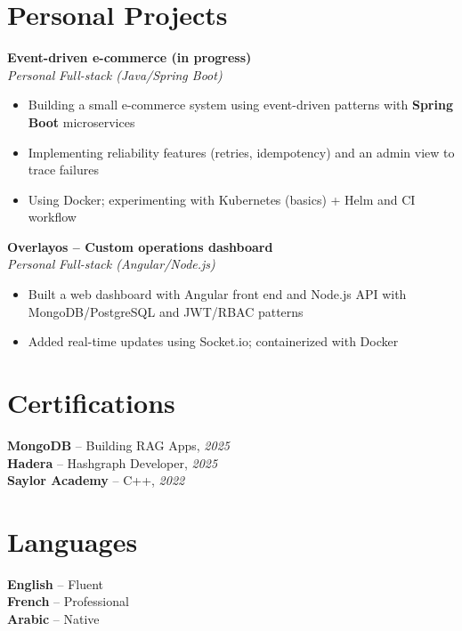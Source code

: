 \documentclass[10pt,a4paper]{article}
\begin{document}
\vspace{4pt}
\section*{Personal Projects}
{\small
\textbf{Event-driven e-commerce (in progress)}\\[1pt]
\textit{Personal} \hfill \textit{Full-stack (Java/Spring Boot)}
\begin{itemize}
  \item Building a small e-commerce system using event-driven patterns with \textbf{Spring Boot} microservices
  \item Implementing reliability features (retries, idempotency) and an admin view to trace failures
  \item Using Docker; experimenting with Kubernetes (basics) + Helm and CI workflow
\end{itemize}

\vspace{2pt}
\textbf{Overlayos -- Custom operations dashboard}\\[1pt]
\textit{Personal} \hfill \textit{Full-stack (Angular/Node.js)}
\begin{itemize}
  \item Built a web dashboard with Angular front end and Node.js API with MongoDB/PostgreSQL and JWT/RBAC patterns
  \item Added real-time updates using Socket.io; containerized with Docker
\end{itemize}
}

\vspace{3pt}
\section*{Certifications}
{\small
\textbf{MongoDB} -- Building RAG Apps, \textit{2025}\\[1pt]
\textbf{Hadera} -- Hashgraph Developer, \textit{2025}\\[1pt]
\textbf{Saylor Academy} -- C++, \textit{2022}
}

\section*{Languages}
{\small
\textbf{English} -- Fluent\\[1pt]
\textbf{French} -- Professional\\[1pt]
\textbf{Arabic} -- Native
}
\end{document}
